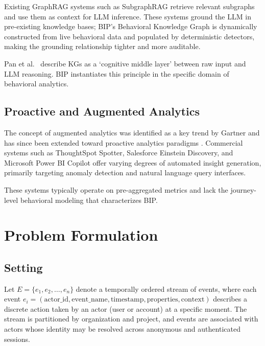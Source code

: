\documentclass[12pt, a4paper]{article}
\begin{document}
Existing GraphRAG systems such as SubgraphRAG \cite{li2024} retrieve relevant subgraphs and use them as context for LLM inference. These systems ground the LLM in pre-existing knowledge bases; BIP's Behavioral Knowledge Graph is dynamically constructed from live behavioral data and populated by deterministic detectors, making the grounding relationship tighter and more auditable.

Pan et al.\ \cite{pan2024} describe KGs as a `cognitive middle layer' between raw input and LLM reasoning. BIP instantiates this principle in the specific domain of behavioral analytics.

\subsection{Proactive and Augmented Analytics}

The concept of augmented analytics was identified as a key trend by Gartner \cite{gartner2019} and has since been extended toward proactive analytics paradigms \cite{gartner2025}. Commercial systems such as ThoughtSpot Spotter, Salesforce Einstein Discovery, and Microsoft Power BI Copilot offer varying degrees of automated insight generation, primarily targeting anomaly detection and natural language query interfaces.

These systems typically operate on pre-aggregated metrics and lack the journey-level behavioral modeling that characterizes BIP.

\section{Problem Formulation}
\label{sec:problem}

\subsection{Setting}

Let $E = \{e_1, e_2, \ldots, e_n\}$ denote a temporally ordered stream of events, where each event $e_i = (\text{actor\_id}, \text{event\_name}, \text{timestamp}, \text{properties}, \text{context})$ describes a discrete action taken by an actor (user or account) at a specific moment. The stream is partitioned by organization and project, and events are associated with actors whose identity may be resolved across anonymous and authenticated sessions.
\end{document}
